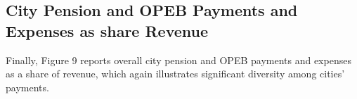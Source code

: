 \documentclass[12pt]{article}
\begin{document}
\begin{figure}
  \label{fig:key}
\end{figure}

\subsection{City Pension and OPEB Payments and Expenses as share
Revenue}

Finally, Figure 9 reports overall city pension and OPEB payments and expenses
as a share of revenue, which again illustrates significant diversity
among cities' payments.

\begin{figure}
  \label{fig:key}
\end{figure}
\end{document}
